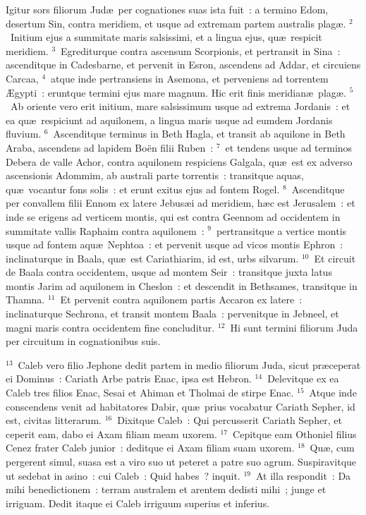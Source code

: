 \lettrine[lines=3,image=true,loversize=0.05,lraise=-0.03]{I}{}gitur sors filiorum Jud\ae\ per cognationes suas ista fuit~: a termino Edom, desertum Sin, contra meridiem, et usque ad extremam partem australis plag\ae .
${}^{2}$~Initium ejus a summitate maris salsissimi, et a lingua ejus, qu\ae\ respicit meridiem.
${}^{3}$~Egrediturque contra ascensum Scorpionis, et pertransit in Sina~: ascenditque in Cadesbarne, et pervenit in Esron, ascendens ad Addar, et circuiens Carcaa,
${}^{4}$~atque inde pertransiens in Asemona, et perveniens ad torrentem \AE gypti~: eruntque termini ejus mare magnum. Hic erit finis meridian\ae\ plag\ae .
${}^{5}$~Ab oriente vero erit initium, mare salsissimum usque ad extrema Jordanis~: et ea qu\ae\ respiciunt ad aquilonem, a lingua maris usque ad eumdem Jordanis fluvium.
${}^{6}$~Ascenditque terminus in Beth Hagla, et transit ab aquilone in Beth Araba, ascendens ad lapidem Bo\"en filii Ruben~:
${}^{7}$~et tendens usque ad terminos Debera de valle Achor, contra aquilonem respiciens Galgala, qu\ae\ est ex adverso ascensionis Adommim, ab australi parte torrentis~: transitque aquas, qu\ae\ vocantur fons solis~: et erunt exitus ejus ad fontem Rogel.
${}^{8}$~Ascenditque per convallem filii Ennom ex latere Jebus\ae i ad meridiem, h\ae c est Jerusalem~: et inde se erigens ad verticem montis, qui est contra Geennom ad occidentem in summitate vallis Raphaim contra aquilonem~:
${}^{9}$~pertransitque a vertice montis usque ad fontem aqu\ae\ Nephtoa~: et pervenit usque ad vicos montis Ephron~: inclinaturque in Baala, qu\ae\ est Cariathiarim, id est, urbs silvarum.
${}^{10}$~Et circuit de Baala contra occidentem, usque ad montem Seir~: transitque juxta latus montis Jarim ad aquilonem in Cheslon~: et descendit in Bethsames, transitque in Thamna.
${}^{11}$~Et pervenit contra aquilonem partis Accaron ex latere~: inclinaturque Sechrona, et transit montem Baala~: pervenitque in Jebneel, et magni maris contra occidentem fine concluditur.
${}^{12}$~Hi sunt termini filiorum Juda per circuitum in cognationibus suis.


${}^{13}$~Caleb vero filio Jephone dedit partem in medio filiorum Juda, sicut pr\ae ceperat ei Dominus~: Cariath Arbe patris Enac, ipsa est Hebron.
${}^{14}$~Delevitque ex ea Caleb tres filios Enac, Sesai et Ahiman et Tholmai de stirpe Enac.
${}^{15}$~Atque inde conscendens venit ad habitatores Dabir, qu\ae\ prius vocabatur Cariath Sepher, id est, civitas litterarum.
${}^{16}$~Dixitque Caleb~: Qui percusserit Cariath Sepher, et ceperit eam, dabo ei Axam filiam meam uxorem.
${}^{17}$~Cepitque eam Othoniel filius Cenez frater Caleb junior~: deditque ei Axam filiam suam uxorem.
${}^{18}$~Qu\ae , cum pergerent simul, suasa est a viro suo ut peteret a patre suo agrum. Suspiravitque ut sedebat in asino~: cui Caleb~: Quid habes~? inquit.
${}^{19}$~At illa respondit~: Da mihi benedictionem~: terram australem et arentem dedisti mihi~; junge et irriguam. Dedit itaque ei Caleb irriguum superius et inferius.



